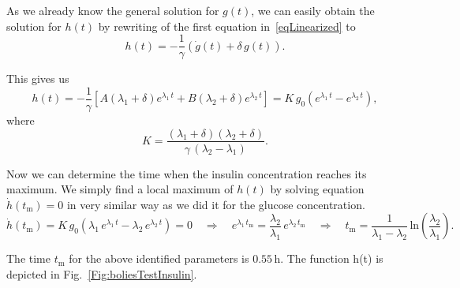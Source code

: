 \documentclass{article}
\providecommand{\m}[1]{\ensuremath{\mathrm{#1}}}
\begin{document}
As we already know the general solution for $g(t)$, we can easily obtain the solution for $h(t)$ by rewriting of the first equation in~\eqref{eqLinearized} to
\begin{equation}
	h(t) = -\frac{1}{\gamma}\left( \dot{g}(t) + \delta\,g(t)\right).
\end{equation}

This gives us
\begin{equation}
	h(t) = -\frac{1}{\gamma}\left[   A(\lambda_1 + \delta)e^{\lambda_1\,t} + B(\lambda_2 + \delta)e^{\lambda_2\,t}  \right] = K\,g_0 \left(e^{\lambda_1\,t} - e^{\lambda_2\,t} \right),
\end{equation}
where $$K=\frac{(\lambda_1+\delta)(\lambda_2+\delta)}{\gamma\,(\lambda_2-\lambda_1)}.$$

Now we can determine the time when the insulin concentration reaches its maximum. We simply find a local maximum of $h(t)$ by solving equation $\dot{h}(t_\m{m})=0$ in very similar way as we did it for the glucose concentration.
\begin{equation*}
	\dot{h}(t_\m{m}) = K\,g_0 \left( \lambda_1\,e^{\lambda_1 \, t} - \lambda_2\,e^{\lambda_2 \, t} \right) = 0		\quad\Rightarrow\quad
	e^{\lambda_1\,t_\m{m}} = \frac{\lambda_2}{\lambda_1}\,e^{\lambda_2\,t_\m{m}} 	\quad\Rightarrow\quad
	t_\m{m} = \frac{1}{\lambda_1 - \lambda_2}\,\m{ln}\left(\frac{\lambda_2}{\lambda_1}\right).
\end{equation*}

The time $t_\m{m}$ for the above identified parameters is $0.55\,\si{\hour}$. The function h(t) is depicted in Fig.~\ref{Fig:boliesTestInsulin}.
\end{document}

